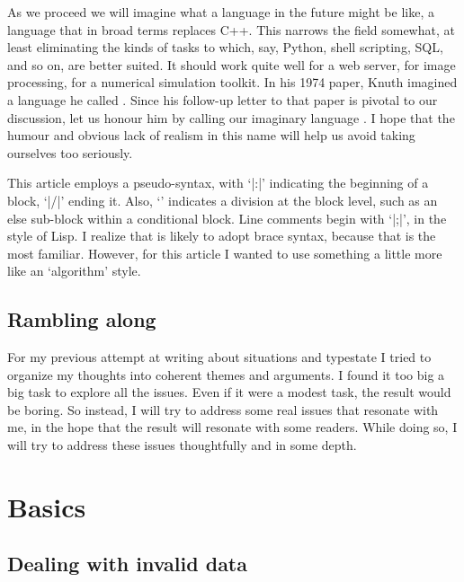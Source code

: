 \documentclass[10pt]{amsart}
\begin{document}
As we proceed we will imagine what a language in the future might be
like, a language that in broad terms replaces C++.  This narrows the
field somewhat, at least eliminating the kinds of tasks to which, say,
Python, shell scripting, SQL, and so on, are better suited.  It should
work quite well for a web server, for image processing, for a
numerical simulation toolkit.  In his 1974 paper, Knuth imagined a
language he called \UtopiaOld.  Since his follow-up letter to that
paper is pivotal to our discussion, let us honour him by calling our
imaginary language \Utop.  I hope that the humour and obvious lack of
realism in this name will help us avoid taking ourselves too
seriously.



This article employs  a pseudo-syntax, with `|:|' indicating the
beginning of a block, `|/|' ending it.  Also, `\texttt{\cdedent}'
indicates a division at the block level, such as an else sub-block
within a conditional block.  Line comments begin with `|;|', in the
style of Lisp.  I realize that \Utop is likely to adopt brace syntax,
because that is the most familiar.  However, for this article I wanted
to use something a little more like an `algorithm' style.

\subsection{Rambling along}

For my previous attempt at writing about situations and typestate I
tried to organize my thoughts into coherent themes and arguments.  I
found it too big a big task to explore all the issues.  Even if it
were a modest task, the result would be boring.  So instead, I will
try to address some real issues that resonate with me, in the hope
that the result will resonate with some readers.  While doing so, I
will try to address these issues thoughtfully and in some depth.


\section{Basics}

\subsection{Dealing with invalid data}
\end{document}
